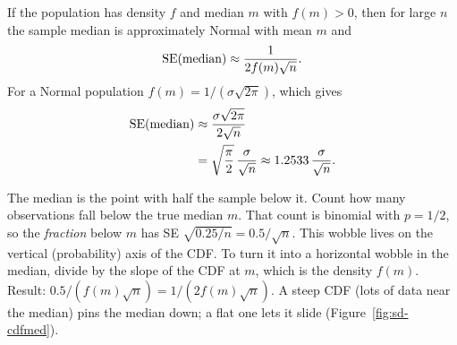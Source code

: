 \begin{theorem}
\label{thm:sd-median}
If the population has density $f$ and median $m$ with $f(m)>0$, then for large
$n$ the sample median is approximately Normal with mean $m$ and
\[
\operatorname{SE}(\text{median})\approx\frac{1}{2f(m)\sqrt n}.
\]
For a Normal population $f(m)=1/(\sigma\sqrt{2\pi})$, which gives
\begin{align*}
\operatorname{SE}(\text{median}) &\approx \frac{\sigma\sqrt{2\pi}}{2\sqrt n} \\
&= \sqrt{\frac{\pi}{2}}\,\frac{\sigma}{\sqrt n} \approx 1.2533\,\frac{\sigma}{\sqrt n}.
\end{align*}
\end{theorem}

\begin{whybox}
The median is the point with half the sample below it. Count how many
observations fall below the true median $m$. That count is binomial with $p=1/2$,
so the \emph{fraction} below $m$ has SE $\sqrt{0.25/n}=0.5/\sqrt n$. This wobble
lives on the vertical (probability) axis of the CDF. To turn it into a horizontal
wobble in the median, divide by the slope of the CDF at $m$, which is the density
$f(m)$. Result: $0.5/(f(m)\sqrt n)=1/(2f(m)\sqrt n)$. A steep CDF (lots of data
near the median) pins the median down; a flat one lets it slide
(Figure~\ref{fig:sd-cdfmed}).
\end{whybox}


